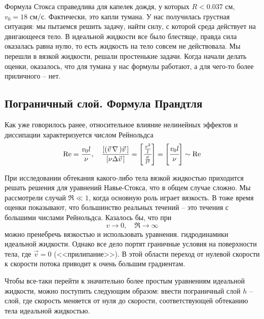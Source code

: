 Формула Стокса справедлива для капелек дождя, у которых $R<0.037$ см, $v_0 = 18 $ см/с. 
Фактически, это капли тумана.
У нас получилась грустная ситуация: мы пытаемся решить задачу, найти силу, с которой среда действует на двигающееся тело. 
В идеальной жидкости все было блестяще, правда сила оказалась равна нулю, то есть жидкость на тело совсем не действовала.
Мы перешли в вязкой жидкости, решали простенькие задачи. Когда начали делать оценки, оказалось, что для тумана у нас формулы работают, а для чего-то более приличного -- нет.

\subsection{Пограничный слой. Формула Прандтля}

 Как уже говорилось ранее, относительное влияние нелинейных эффектов и диссипации характеризуется числом Рейнольдса
\begin{equation}
    \Re = \frac{v_0 l}{\nu}, \quad \frac{[(\vec{v}\, \nabla\,)\vec{v}\,]}{[\nu \Delta \vec{v}\,]}= 
    \qty[
    	\cfrac{\frac{v^2}{l}}{\frac{\nu}{l^2}}
    	]=\qty[\cfrac{v_0 l}{\nu}] \sim \Re
\end{equation}

При исследовании обтекания какого-либо тела вязкой жидкостью приходится решать решения для уравнений Навье-Стокса, что в общем случае сложно.
Мы рассмотрели случай  $\Re \ll 1$, когда основную роль играет вязкость. В тоже время оценки показывают, что большинство реальных течений -- это течения с большими числами Рейнольдса. Казалось бы, что при   
\begin{equation}
 	v \to 0, \quad \Re \to \infty
 \end{equation} 
можно пренебречь вязкостью и использовать уравнения. гидродинамики идеальной жидкости. Однако все дело портят граничные условия на поверхности тела, где $\vec{v}=0$ (<<прилипание>>). В этой области переход от нулевой скорости к скорости потока приводит к очень большим градиентам. 

Чтобы все-таки перейти к значительно более простым уравнениям идеальной жидкости, можно поступить следующим образом: ввести пограничный слой $h$ -- слой, где скорость меняется от нуля до скорости, соответствующей обтеканию тела идеальной жидкостью\footnotemark.

